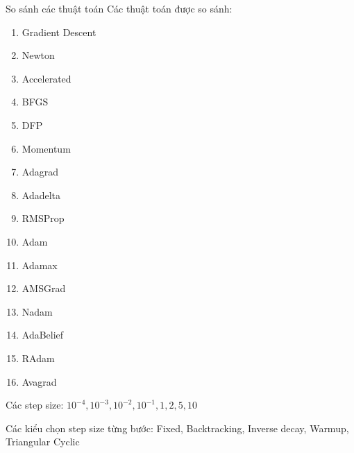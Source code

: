 \documentclass[10pt]{beamer}
\theoremstyle{remark}
\theoremstyle{definition}
\begin{document}
\begin{frame}{So sánh các thuật toán}
	Các thuật toán được so sánh:
	\begin{multicols}{3}
	\begin{enumerate}
		\item Gradient Descent
  		\item Newton
    	\item Accelerated
     	\item BFGS
      	\item DFP
        \item Momentum
        \item Adagrad
        \item Adadelta
        \item RMSProp
        \item Adam
        \item Adamax
        \item AMSGrad
        \item Nadam
        \item AdaBelief
        \item RAdam
        \item Avagrad    
	\end{enumerate}
	\end{multicols}
	Các step size: $10^{-4}, 10^{-3}, 10^{-2}, 10^{-1}, 1, 2, 5, 10$
	
	Các kiểu chọn step size từng bước: Fixed, Backtracking, Inverse decay, Warmup, Triangular Cyclic

\end{frame}
\end{document}
